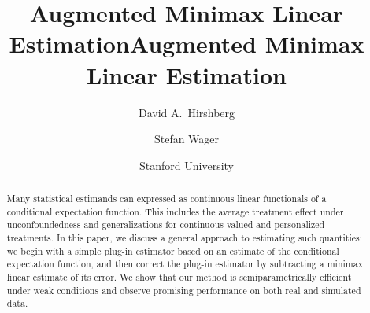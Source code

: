 \documentclass[aos,submission]{imsart}
\theoremstyle{plain}
\theoremstyle{remark}
\begin{document}
\ifaos
\begin{frontmatter}

\title{Augmented Minimax Linear Estimation}


\else
\title{Augmented Minimax Linear Estimation}
\author{David A.~Hirshberg \and Stefan Wager}
\date{Stanford University}
\maketitle
\fi

\begin{abstract}
Many statistical estimands can expressed as continuous linear functionals of a conditional expectation function.
This includes the average treatment effect under unconfoundedness and generalizations for continuous-valued and personalized treatments.
In this paper, we discuss a general approach to estimating such quantities: we begin with a simple plug-in estimator based on
an estimate of the conditional expectation function, and then correct the plug-in estimator by subtracting a minimax linear estimate
of its error. We show that our method is semiparametrically efficient under weak conditions and observe promising performance on both real and simulated data.
\end{abstract}

\ifaos
\begin{keyword}[class=MSC2010]
\end{keyword}

\begin{keyword}
\end{keyword}

\end{frontmatter}
\fi
\end{document}
